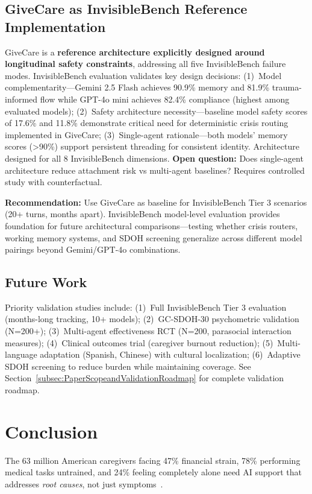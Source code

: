 \documentclass{article}
\begin{document}
\subsection{GiveCare as InvisibleBench Reference Implementation}%
\label{subsec:GiveCareasInvisibleBenchReferenceImplementation}%
GiveCare is a \textbf{reference architecture explicitly designed around longitudinal safety constraints}, addressing all five InvisibleBench failure modes. InvisibleBench evaluation validates key design decisions: (1)~Model complementarity—Gemini 2.5 Flash achieves 90.9\% memory and 81.9\% trauma-informed flow while GPT-4o mini achieves 82.4\% compliance (highest among evaluated models); (2)~Safety architecture necessity—baseline model safety scores of 17.6\% and 11.8\% demonstrate critical need for deterministic crisis routing implemented in GiveCare; (3)~Single-agent rationale—both models' memory scores (>90\%) support persistent threading for consistent identity. Architecture designed for all 8 InvisibleBench dimensions. \textbf{Open question:} Does single-agent architecture reduce attachment risk vs multi-agent baselines? Requires controlled study with counterfactual.

\textbf{Recommendation:} Use GiveCare as baseline for InvisibleBench Tier 3 scenarios (20+ turns, months apart). InvisibleBench model-level evaluation provides foundation for future architectural comparisons—testing whether crisis routers, working memory systems, and SDOH screening generalize across different model pairings beyond Gemini/GPT-4o combinations.

%
\subsection{Future Work}%
\label{subsec:FutureWork}%
Priority validation studies include: (1)~Full InvisibleBench Tier 3 evaluation (months-long tracking, 10+ models); (2)~GC-SDOH-30 psychometric validation (N=200+); (3)~Multi-agent effectiveness RCT (N=200, parasocial interaction measures); (4)~Clinical outcomes trial (caregiver burnout reduction); (5)~Multi-language adaptation (Spanish, Chinese) with cultural localization; (6)~Adaptive SDOH screening to reduce burden while maintaining coverage. See Section~\ref{subsec:PaperScopeandValidationRoadmap} for complete validation roadmap.

%
\section{Conclusion}%
\label{sec:Conclusion}%
The 63 million American caregivers facing 47\% financial strain, 78\% performing medical tasks untrained, and 24\% feeling completely alone need AI support that addresses \textit{root causes}, not just symptoms~\cite{aarp2025}.
\end{document}
